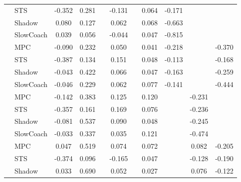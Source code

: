 \begin{tabular}{|l|l|*{9}{c|}}
                                                           & STS &   -0.352 &     0.281 &        & -0.131 &     &  0.064 &  -0.171 &      &       \\
                                                           & Shadow &    0.080 &     0.127 &        &  0.062 &     &  0.068 &  -0.663 &      &       \\
                                                           & SlowCoach &    0.039 &     0.056 &        & -0.044 &     &  0.047 &  -0.815 &      &       \\
\midrule
[True, True, False, True, False, True, True, False, True] & MPC &   -0.090 &     0.232 &        &  0.050 &     &  0.041 &  -0.218 &      &   -0.370 \\
                                                           & STS &   -0.387 &     0.134 &        &  0.151 &     &  0.048 &  -0.113 &      &   -0.168 \\
                                                           & Shadow &   -0.043 &     0.422 &        &  0.066 &     &  0.047 &  -0.163 &      &   -0.259 \\
                                                           & SlowCoach &   -0.046 &     0.229 &        &  0.062 &     &  0.077 &  -0.141 &      &   -0.444 \\
\midrule
[True, True, False, True, False, True, False, True, False] & MPC &   -0.142 &     0.383 &        &  0.125 &     &  0.120 &      &  -0.231 &       \\
                                                           & STS &   -0.357 &     0.161 &        &  0.169 &     &  0.076 &      &  -0.236 &       \\
                                                           & Shadow &   -0.081 &     0.537 &        &  0.090 &     &  0.048 &      &  -0.245 &       \\
                                                           & SlowCoach &   -0.033 &     0.337 &        &  0.035 &     &  0.121 &      &  -0.474 &       \\
\midrule
[True, True, False, True, False, True, False, True, True] & MPC &    0.047 &     0.519 &        &  0.074 &     &  0.072 &      &   0.082 &   -0.205 \\
                                                           & STS &   -0.374 &     0.096 &        & -0.165 &     &  0.047 &      &  -0.128 &   -0.190 \\
                                                           & Shadow &    0.033 &     0.690 &        &  0.052 &     &  0.027 &      &   0.076 &   -0.122 \\

\end{tabular}
